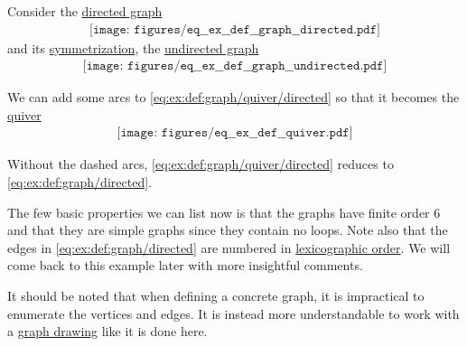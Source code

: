 \begin{example}\label{ex:def:graph}
  Consider the \hyperref[def:graph/directed]{directed graph}
  \begin{equation}\label{eq:ex:def:graph/directed}
    \begin{aligned}
      \texttt{[image: figures/eq\_\_ex\_\_def\_\_graph\_\_directed.pdf]}
    \end{aligned}
  \end{equation}
  and its \hyperref[rem:undirected_graphs_as_directed]{symmetrization}, the \hyperref[def:graph/undirected]{undirected graph}
  \begin{equation}\label{eq:ex:def:graph/undirected}
    \begin{aligned}
      \texttt{[image: figures/eq\_\_ex\_\_def\_\_graph\_\_undirected.pdf]}
    \end{aligned}
  \end{equation}

  We can add some arcs to \eqref{eq:ex:def:graph/quiver/directed} so that it becomes the \hyperref[def:graph/quiver]{quiver}
  \begin{equation}\label{eq:ex:def:graph/quiver}
    \begin{aligned}
      \texttt{[image: figures/eq\_\_ex\_\_def\_\_quiver.pdf]}
    \end{aligned}
  \end{equation}

  Without the dashed arcs, \eqref{eq:ex:def:graph/quiver/directed} reduces to \eqref{eq:ex:def:graph/directed}.

  The few basic properties we can list now is that the graphs have finite order \( 6 \) and that they are simple graphs since they contain no loops. Note also that the edges in \eqref{eq:ex:def:graph/directed} are numbered in \hyperref[eq:def:lexicographic_order]{lexicographic order}. We will come back to this example later with more insightful comments.

  It should be noted that when defining a concrete graph, it is impractical to enumerate the vertices and edges. It is instead more understandable to work with a \hyperref[def:graph_geometric_realization/drawing]{graph drawing} like it is done here.
\end{example}

